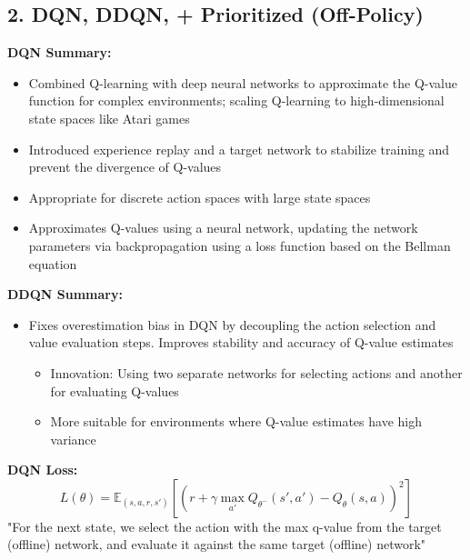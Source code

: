 \documentclass[letterpaper,10pt]{article}
\begin{document}
\begin{multicols}{2}
\section*{2. DQN, DDQN, + Prioritized (Off-Policy)}
\textbf{DQN Summary:}
\begin{itemize}
    \item Combined Q-learning with deep neural networks to approximate the Q-value function for complex environments; scaling Q-learning to high-dimensional state spaces like Atari games
    \item Introduced experience replay and a target network to stabilize training and prevent the divergence of Q-values
    \item Appropriate for discrete action spaces with large state spaces
    \item Approximates Q-values using a neural network, updating the network parameters via backpropagation using a loss function based on the Bellman equation
\end{itemize}

\noindent \textbf{DDQN Summary:}
\begin{itemize}
    \item Fixes overestimation bias in DQN by decoupling the action selection and value evaluation steps. Improves stability and accuracy of Q-value estimates
    \begin{itemize}
        \item Innovation: Using two separate networks for selecting actions and another for evaluating Q-values
        \item More suitable for environments where Q-value estimates have high variance
    \end{itemize}
\end{itemize}


\noindent \textbf{DQN Loss:}
\[
L(\theta) = \mathbb{E}_{(s, a, r, s')} \left[ \left( r + \gamma \max_{a'} Q_{\theta^-}(s', a') - Q_\theta(s, a) \right)^2 \right]
\]
"For the next state, we select the action with the max q-value from the target (offline) network, and evaluate it against the same target (offline) network"


\end{multicols}
\end{document}
